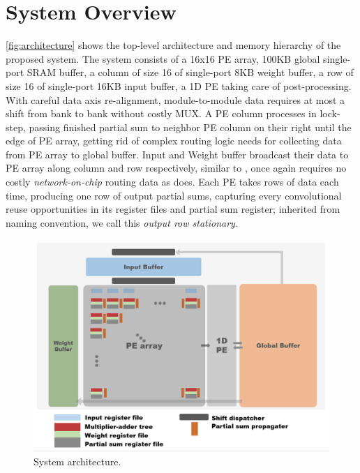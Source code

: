 \section{System Overview}
\autoref{fig:architecture} shows the top-level architecture and memory hierarchy of the proposed system. The system consists of a 16x16 PE array, 100KB global single-port SRAM buffer, a column of size 16 of single-port 8KB weight buffer, a row of size 16 of single-port 16KB input buffer, a 1D PE taking care of post-processing. With careful data axis re-alignment, module-to-module data requires at most a shift from bank to bank without costly MUX. A PE column processes in lock-step, passing finished partial sum to neighbor PE column on their right until the edge of PE array, getting rid of complex routing logic needs for collecting data from PE array to global buffer. Input and Weight buffer broadcast their data to PE array along column and row respectively, similar to \cite{PrecisionScalableVLSI}\cite{ENVISION}, once again requires no costly \textit{network-on-chip} routing data as \cite{Eyeriss} does. Each PE takes rows of data each time, producing one row of output partial sums, capturing every convolutional reuse opportunities in its register files and partial sum register; inherited from \cite{Eyeriss} naming convention, we call this \textit{output row stationary}.  
\begin{figure}
    \centering
    \includegraphics[width=0.8\linewidth]{inc/4_proposed_architecture/figure/architecture.png}
    \caption{System architecture.}
    \label{fig:architecture}
\end{figure}



